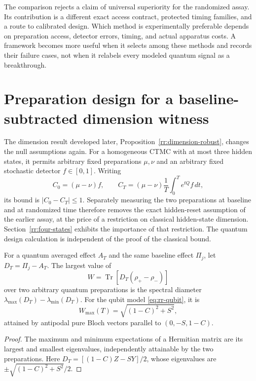The comparison rejects a claim of universal superiority for the randomized
assay.  Its contribution is a different exact access contract, protected timing
families, and a route to calibrated design.  Which method is experimentally
preferable depends on preparation access, detector errors, timing, and actual
apparatus costs.  A framework becomes more useful when it selects among these
methods and records their failure cases, not when it relabels every modeled
quantum signal as a breakthrough.

\section{Preparation design for a baseline-subtracted dimension witness}
\label{sec:rr-baseline-preparation}

The dimension result developed later, Proposition~\ref{rr:dimension-robust},
changes the null assumptions again.  For a homogeneous CTMC with at most three
hidden states, it permits arbitrary fixed preparations $\mu,\nu$ and an
arbitrary fixed stochastic detector $f\in[0,1]$.  Writing
\[
 C_0=(\mu-\nu)f,\qquad
 C_T=(\mu-\nu)\frac1T\int_0^T e^{tQ}f\,dt,
\]
its bound is $|C_0-C_T|\le1$.  Separately measuring the two preparations at
baseline and at randomized time therefore removes the exact hidden-reset
assumption of the earlier assay, at the price of a restriction on classical
hidden-state dimension.  Section~\ref{rr:four-states} exhibits the importance
of that restriction.  The quantum design calculation is independent of the
proof of the classical bound.

\begin{lemma}
\label{lem:rr-dimension-preparation}
For a quantum averaged effect $A_T$ and the same baseline effect $\Pi_j$, let
$D_T=\Pi_j-A_T$.  The largest value of
\[
 W=\operatorname{Tr}\!\left[D_T(\rho_+-\rho_-)\right]
\]
over two arbitrary quantum preparations is the spectral diameter
$\lambda_{\max}(D_T)-\lambda_{\min}(D_T)$.
For the qubit model \eqref{eq:rr-qubit}, it is
\begin{equation}
 W_{\max}(T)=\sqrt{(1-C)^2+S^2},
 \label{eq:rr-dimension-optimum}
\end{equation}
attained by antipodal pure Bloch vectors parallel to $(0,-S,1-C)$.
\end{lemma}

\begin{proof}
The maximum and minimum expectations of a Hermitian matrix are its largest and
smallest eigenvalues, independently attainable by the two preparations.
Here $D_T=[(1-C)Z-SY]/2$, whose eigenvalues are
$\pm\sqrt{(1-C)^2+S^2}/2$.
\end{proof}

